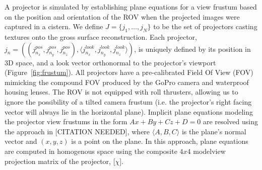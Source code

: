 \documentclass[a4paper,twoside]{article}
\begin{document}
A projector is simulated by establishing plane equations for a view frustum based on the position and orientation of the ROV when the projected images were captured in a cistern. We define $J = \{j_{1},\dots,j_{N}\}$ to be the set of projectors casting textures onto the gross surface reconstruction. Each projector, $j_{n} = ((j_{n_{x}}^{pos},j_{n_{y}}^{pos},j_{n_{z}}^{pos}), \langle j_{n_{x}}^{look},j_{n_{y}}^{look},j_{n_{z}}^{look}\rangle)$, is uniquely defined by its position in 3D space, and a look vector orthonormal to the projector's viewport (Figure~\ref{fig:frustum}). All projectors have a pre-calibrated Field Of View (FOV) mimicking the compound FOV produced by the GoPro camera and waterproof housing lenses. The ROV is not equipped with roll thrusters, allowing us to ignore the possibility of a tilted camera frustum (i.e. the projector's right facing vector will always lie in the horizontal plane). Implicit plane equations modeling the projector view frustums in the form $Ax + By + Cz + D = 0$ are resolved using the approach in [CITATION NEEDED], where $\langle A, B, C\rangle$ is the plane's normal vector and  $(x, y, z)$ is a point on the plane. In this approach, plane equations are computed in homogenous space using the composite $4x4$ modelview projection matrix of the projector, $\lbrack \chi \rbrack$.
\end{document}
